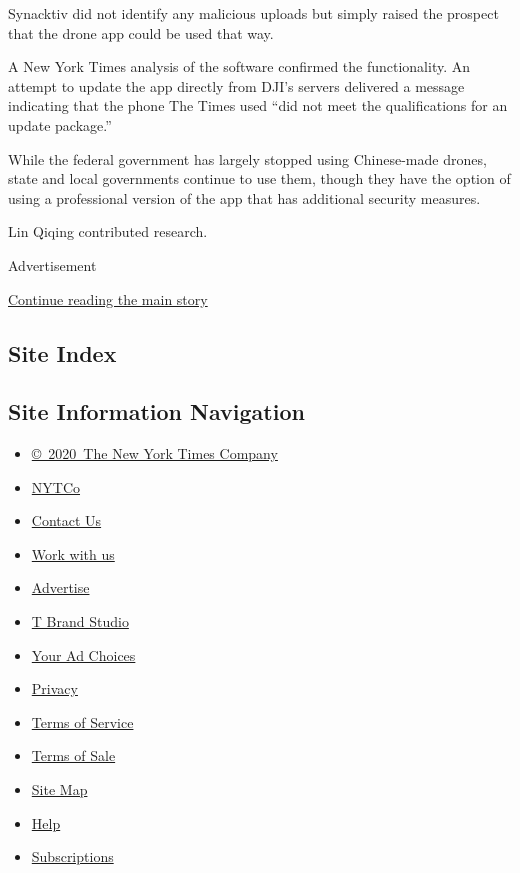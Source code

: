 Synacktiv did not identify any malicious uploads but simply raised the
prospect that the drone app could be used that way.

A New York Times analysis of the software confirmed the functionality.
An attempt to update the app directly from DJI's servers delivered a
message indicating that the phone The Times used ``did not meet the
qualifications for an update package.''

While the federal government has largely stopped using Chinese-made
drones, state and local governments continue to use them, though they
have the option of using a professional version of the app that has
additional security measures.

Lin Qiqing contributed research.

Advertisement

\protect\hyperlink{after-bottom}{Continue reading the main story}

\hypertarget{site-index}{%
\subsection{Site Index}\label{site-index}}

\hypertarget{site-information-navigation}{%
\subsection{Site Information
Navigation}\label{site-information-navigation}}

\begin{itemize}
\tightlist
\item
  \href{https://help.nytimes.com/hc/en-us/articles/115014792127-Copyright-notice}{©~2020~The
  New York Times Company}
\end{itemize}

\begin{itemize}
\tightlist
\item
  \href{https://www.nytco.com/}{NYTCo}
\item
  \href{https://help.nytimes.com/hc/en-us/articles/115015385887-Contact-Us}{Contact
  Us}
\item
  \href{https://www.nytco.com/careers/}{Work with us}
\item
  \href{https://nytmediakit.com/}{Advertise}
\item
  \href{http://www.tbrandstudio.com/}{T Brand Studio}
\item
  \href{https://www.nytimes.com/privacy/cookie-policy\#how-do-i-manage-trackers}{Your
  Ad Choices}
\item
  \href{https://www.nytimes.com/privacy}{Privacy}
\item
  \href{https://help.nytimes.com/hc/en-us/articles/115014893428-Terms-of-service}{Terms
  of Service}
\item
  \href{https://help.nytimes.com/hc/en-us/articles/115014893968-Terms-of-sale}{Terms
  of Sale}
\item
  \href{https://spiderbites.nytimes.com}{Site Map}
\item
  \href{https://help.nytimes.com/hc/en-us}{Help}
\item
  \href{https://www.nytimes.com/subscription?campaignId=37WXW}{Subscriptions}
\end{itemize}
